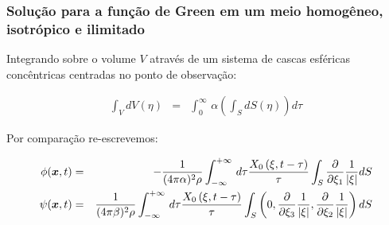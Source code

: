 \documentclass{beamer}
\newcommand{\xvec}{\vc{x}}
\newcommand{\xivec}{\boldmath \xi}
\begin{document}
\begin{frame}
	\frametitle{\textbf{Solu\c{c}\~ao para a fun\c{c}\~ao de Green em um meio homog\^eneo, isotr\'opico e ilimitado}}
	
	\begin{flushleft}
		\textcolor{red!60!black}{
			Integrando sobre o volume $V$ atrav\'es de um sistema de cascas esf\'ericas conc\^entricas centradas no ponto de observa\c{c}\~ao:}
	\end{flushleft}        
	\begin{eqnarray}
	\int_{V}dV(\eta) &=& \int_{0}^{\infty} \, \alpha \left( \int_{S} dS(\eta) \right) d\tau\, 
	\end{eqnarray}
	
	\begin{flushleft}
		Por compara\c{c}\~ao re-escrevemos:
	\end{flushleft}
	\begin{eqnarray}
	\label{ten1}
	\phi(\xvec,t) &=& - \frac{1}{(4\pi\alpha)^{2} \rho}  \int_{-\infty}^{+\infty}\, d\tau \frac{ X_{0} \left( \xivec,t - \tau  \right) }{\tau}  \int_{S}\frac{\partial }{\partial \xi_1} \frac{1}{\left| \xivec \right|} dS\, \\
	\psi(\xvec,t) &=& \frac{1}{(4\pi\beta)^{2} \rho}  \int_{-\infty}^{+\infty}\, d\tau  \frac{ X_{0}  \left( \xivec,t - \tau  \right) }{\tau}    \int_{S} \left(0, \frac{\partial }{\partial \xi_3} \frac{1}{\left| \xivec \right|}, \frac{\partial }{\partial \xi_2} \frac{1}{\left| \xivec \right|} \right) dS \, \nonumber \\
	\end{eqnarray}
	
\end{frame}%
\end{document}

